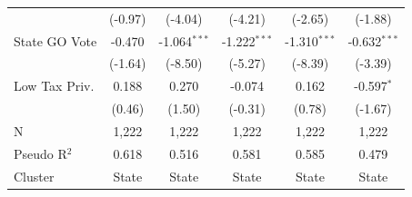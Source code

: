 \begin{tabular*}{\textwidth}{@{\extracolsep{\fill}}lccccc}
                        & (-0.97)      & (-4.04)       & (-4.21)       & (-2.65)       & (-1.88)\\   
   State GO Vote        & -0.470        & -1.064$^{***}$ & -1.222$^{***}$ & -1.310$^{***}$ & -0.632$^{***}$\\   
                        & (-1.64)      & (-8.50)       & (-5.27)       & (-8.39)       & (-3.39)\\   
   Low Tax Priv.        & 0.188         & 0.270          & -0.074         & 0.162          & -0.597$^{*}$\\   
                        & (0.46)       & (1.50)        & (-0.31)       & (0.78)        & (-1.67)\\   
   \hline
   N         & 1,222         & 1,222          & 1,222          & 1,222          & 1,222\\  
   Pseudo R$^2$         & 0.618         & 0.516          & 0.581          & 0.585          & 0.479\\  
   Cluster              & State & State & State & State & State\\  
   \bottomrule
\end{tabular*}
\par\endgroup
